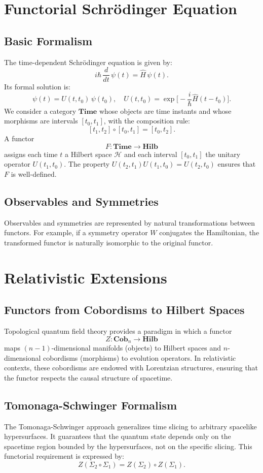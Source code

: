 \documentclass[12pt]{article}
\begin{document}
\section{Functorial Schrödinger Equation}
\subsection{Basic Formalism}
The time-dependent Schrödinger equation is given by:
\[
i\hbar \,\frac{d}{dt}\,\psi(t) = \hat{H}\,\psi(t).
\]
Its formal solution is:
\[
\psi(t) = U(t,t_0)\,\psi(t_0), \quad U(t,t_0)=\exp\!\Big[-\frac{i}{\hbar}\hat{H}(t-t_0)\Big].
\]
We consider a category \(\mathbf{Time}\) whose objects are time instants and whose morphisms are intervals \([t_0,t_1]\), with the composition rule:
\[
[t_1,t_2]\circ[t_0,t_1]=[t_0,t_2].
\]
A functor
\[
F:\mathbf{Time}\to\mathbf{Hilb}
\]
assigns each time \(t\) a Hilbert space \(\mathcal{H}\) and each interval \([t_0,t_1]\) the unitary operator \(U(t_1,t_0)\). The property \(U(t_2,t_1)U(t_1,t_0)=U(t_2,t_0)\) ensures that \(F\) is well-defined.

\subsection{Observables and Symmetries}
Observables and symmetries are represented by natural transformations between functors. For example, if a symmetry operator \(W\) conjugates the Hamiltonian, the transformed functor is naturally isomorphic to the original functor.

\section{Relativistic Extensions}
\subsection{Functors from Cobordisms to Hilbert Spaces}
Topological quantum field theory provides a paradigm in which a functor
\[
Z:\mathbf{Cob}_n\to\mathbf{Hilb}
\]
maps \((n-1)\)-dimensional manifolds (objects) to Hilbert spaces and \(n\)-dimensional cobordisms (morphisms) to evolution operators. In relativistic contexts, these cobordisms are endowed with Lorentzian structures, ensuring that the functor respects the causal structure of spacetime.

\subsection{Tomonaga-Schwinger Formalism}
The Tomonaga-Schwinger approach generalizes time slicing to arbitrary spacelike hypersurfaces. It guarantees that the quantum state depends only on the spacetime region bounded by the hypersurfaces, not on the specific slicing. This functorial requirement is expressed by:
\[
Z(\Sigma_2\circ\Sigma_1)=Z(\Sigma_2)\circ Z(\Sigma_1).
\]
\end{document}
